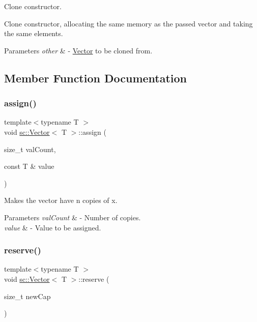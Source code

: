 Clone constructor. 

Clone constructor, allocating the same memory as the passed vector and taking the same elements. 
\begin{DoxyParams}{Parameters}
{\em other} & -\/ \hyperlink{classsc_1_1Vector}{Vector} to be cloned from. \\
\hline
\end{DoxyParams}


\subsection{Member Function Documentation}
\mbox{\label{classsc_1_1Vector_a6b349db72f104336fe4bf06dffaa4979}} 
\subsubsection{\texorpdfstring{assign()}{assign()}}
{\footnotesize\ttfamily template$<$typename T $>$ \\
void \hyperlink{classsc_1_1Vector}{sc\+::\+Vector}$<$ T $>$\+::assign (\begin{DoxyParamCaption}\item[{size\+\_\+t}]{val\+Count,  }\item[{const T \&}]{value }\end{DoxyParamCaption})\hspace{0.3cm}{\ttfamily [inline]}}



Makes the vector have n copies of x. 


\begin{DoxyParams}{Parameters}
{\em val\+Count} & -\/ Number of copies. \\
\hline
{\em value} & -\/ Value to be assigned. \\
\hline
\end{DoxyParams}
\mbox{\label{classsc_1_1Vector_a16435ab7524542a2197d202f45dc80d8}} 
\subsubsection{\texorpdfstring{reserve()}{reserve()}}
{\footnotesize\ttfamily template$<$typename T $>$ \\
void \hyperlink{classsc_1_1Vector}{sc\+::\+Vector}$<$ T $>$\+::reserve (\begin{DoxyParamCaption}\item[{size\+\_\+t}]{new\+Cap }\end{DoxyParamCaption})\hspace{0.3cm}{\ttfamily [inline]}}



